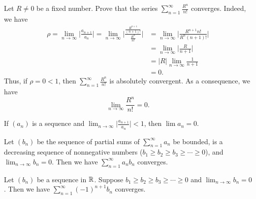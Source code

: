 \documentclass[a4paper]{article}
\begin{document}
\begin{eg}
    Let \( R \neq 0  \) be a fixed number. Prove that the series \( \sum_{ n=1  }^{ \infty  } \frac{ R^{n} }{  n!  }   \) converges. Indeed, we have
    \begin{align*}
    \rho = \lim_{ n \to \infty  }  \Big|  \frac{ {a}_{n+1} }{ {a}_{n} }  \Big|  = \lim_{ n \to \infty  }  \Big|  \frac{ \frac{ R^{n+1} }{ (n+1)! }  }{ \frac{ R^{n} }{ n! }  }  \Big|  &= \lim_{ n \to \infty  }  \Big|  \frac{ R^{n+1} n! }{ R^{n} (n+1)! }  \Big| \\
                                                                                                                                                                                       &= \lim_{ n \to \infty  }  \Big|  \frac{ R  }{ n+1 }  \Big|  \\
                                                                                                                                                                                       &=| R | \lim_{ n \to \infty  }  \frac{ 1 }{ n+1 }  \\
                                                                                                                                                                                       &= 0.
\end{align*}
Thus, if \( \rho = 0 < 1  \), then \( \sum_{ n=1  }^{ \infty  } \frac{ R^{n} }{ n! }  \) is absolutely convergent. As a consequence, we have 
\[  \lim_{ n \to \infty  }  \frac{ R^{n} }{ n! }  = 0. \]
\end{eg}

\begin{remark}
    If \( ({a}_{n}) \) is a sequence and \( \lim_{ n \to \infty  }  \Big|  \frac{ {a}_{n+1} }{ {a}_{n} }  \Big|  < 1 \), then \( \lim {a}_{n} = 0 \).
\end{remark}

\begin{theorem}
    Let \( ({b}_{n}) \) be the sequence of partial sums of \( \sum_{ n=1  }^{ \infty  } {a}_{n} \) be bounded, is a decreasing sequence of nonnegative numbers (\( {b}_{1} \geq {b}_{2} \geq {b}_{3} \geq \cdots \geq 0  \)), and \( \lim_{ n \to \infty  }  {b}_{n} = 0  \). Then we have \( \sum_{ n=1  }^{ \infty  } {a}_{n} {b}_{n} \) converges.
\end{theorem}

\begin{corollary}
    Let \( ({b}_{n}) \) be a sequence in \( \mathbb{R}  \). Suppose \( {b}_{1} \geq {b}_{2} \geq {b}_{3} \geq \cdots \geq 0 \) and \( \lim_{ n \to \infty  }  {b}_{n} = 0 \). Then we have \( \sum_{ n=1  }^{ \infty  } (-1)^{n+1} {b}_{n}  \) converges.
\end{corollary}
\end{document}
